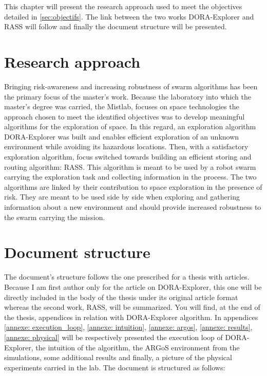 \label{sec:approach}

This chapter will present the research approach used to meet the objectives detailed in \ref{sec:objectifs}. The link between the two works DORA-Explorer and RASS will follow and finally the document structure will be presented.

\section{Research approach}
Bringing risk-awareness and increasing robustness of swarm algorithms has been the primary focus of the master's work. Because the laboratory into which the master's degree was carried, the Mistlab, focuses on space technologies the approach chosen to meet the identified objectives was to develop meaningful algorithms for the exploration of space. In this regard, an exploration algorithm DORA-Explorer was built and enables efficient exploration of an unknown environment while avoiding its hazardous locations. Then, with a satisfactory exploration algorithm, focus switched towards building an efficient storing and routing algorithm: RASS. This algorithm is meant to be used by a robot swarm carrying the exploration task and collecting information in the process. The two algorithms are linked by their contribution to space exploration in the presence of risk. They are meant to be used side by side when exploring and gathering information about a new environment and should provide increased robustness to the swarm carrying the mission.

\section{Document structure}
The document's structure follows the one prescribed for a thesis with articles. Because I am first author only for the article on DORA-Explorer, this one will be directly included in the body of the thesis under its original article format whereas the second work, RASS, will be summarized. You will find, at the end of the thesis, appendices in relation with DORA-Explorer algorithm. In appendices \ref{annexe: execution_loop}, \ref{annexe: intuition}, \ref{annexe: argos}, \ref{annexe: results}, \ref{annexe: physical} will be respectively presented the execution loop of DORA-Explorer, the intuition of the algorithm, the ARGoS environment from the simulations, some additional results and finally, a picture of the physical experiments carried in the lab. The document is structured as follows:

